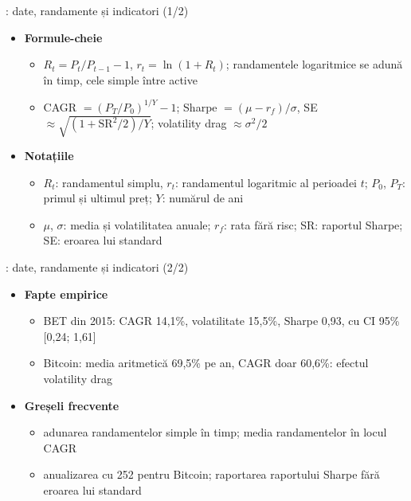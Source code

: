 \begin{frame}{: date, randamente și indicatori (1/2)}
\itemsize{\small}
\begin{itemize}
    \item \textbf{Formule-cheie}
    \begin{itemize}
        \item $R_t = P_t/P_{t-1} - 1$, $r_t = \ln(1 + R_t)$; randamentele logaritmice se adună în timp, cele simple între active
        \item CAGR $= (P_T/P_0)^{1/Y} - 1$; Sharpe $= (\mu - r_f)/\sigma$, SE $\approx \sqrt{(1 + \mathrm{SR}^2/2)/Y}$; volatility drag $\approx \sigma^2/2$
    \end{itemize}
    \item \textbf{Notațiile}
    \begin{itemize}
        \item $R_t$: randamentul simplu, $r_t$: randamentul logaritmic al perioadei $t$; $P_0$, $P_T$: primul și ultimul preț; $Y$: numărul de ani
        \item $\mu$, $\sigma$: media și volatilitatea anuale; $r_f$: rata fără risc; SR: raportul Sharpe; SE: eroarea lui standard
    \end{itemize}
\end{itemize}
\end{frame}

\begin{frame}{: date, randamente și indicatori (2/2)}
\itemsize{\small}
\begin{itemize}
    \item \textbf{Fapte empirice}
    \begin{itemize}
        \item BET din 2015: CAGR 14{,}1\%, volatilitate 15{,}5\%, Sharpe 0{,}93, cu CI 95\% [0{,}24; 1{,}61]
        \item Bitcoin: media aritmetică 69{,}5\% pe an, CAGR doar 60{,}6\%: efectul volatility drag
    \end{itemize}
    \item \textbf{Greșeli frecvente}
    \begin{itemize}
        \item adunarea randamentelor simple în timp; media randamentelor în locul CAGR
        \item anualizarea cu 252 pentru Bitcoin; raportarea raportului Sharpe fără eroarea lui standard
    \end{itemize}
\end{itemize}
\end{frame}

